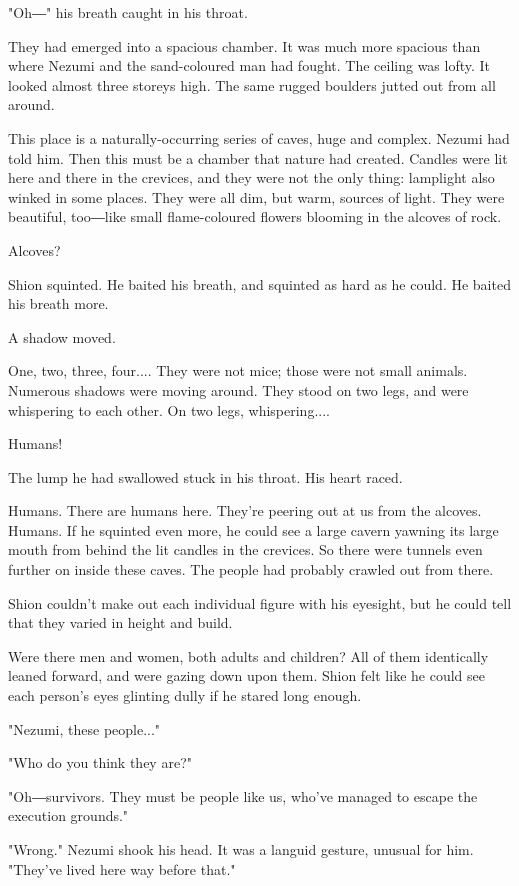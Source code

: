 "Oh―" his breath caught in his throat.

They had emerged into a spacious chamber. It was much more spacious than
where Nezumi and the sand-coloured man had fought. The ceiling was
lofty. It looked almost three storeys high. The same rugged boulders
jutted out from all around.

This place is a naturally-occurring series of caves, huge and complex.
Nezumi had told him. Then this must be a chamber that nature had
created. Candles were lit here and there in the crevices, and they were
not the only thing: lamplight also winked in some places. They were all
dim, but warm, sources of light. They were beautiful, too―like small
flame-coloured flowers blooming in the alcoves of rock.

Alcoves?

Shion squinted. He baited his breath, and squinted as hard as he could.
He baited his breath more.

A shadow moved.

One, two, three, four.... They were not mice; those were not small
animals. Numerous shadows were moving around. They stood on two legs,
and were whispering to each other. On two legs, whispering....

Humans!

The lump he had swallowed stuck in his throat. His heart raced.

Humans. There are humans here. They're peering out at us from the
alcoves. Humans. If he squinted even more, he could see a large cavern
yawning its large mouth from behind the lit candles in the crevices. So
there were tunnels even further on inside these caves. The people had
probably crawled out from there.

Shion couldn't make out each individual figure with his eyesight, but he
could tell that they varied in height and build.

Were there men and women, both adults and children? All of them
identically leaned forward, and were gazing down upon them. Shion felt
like he could see each person's eyes glinting dully if he stared long
enough.

"Nezumi, these people..."

"Who do you think they are?"

"Oh―survivors. They must be people like us, who've managed to escape the
execution grounds."

"Wrong." Nezumi shook his head. It was a languid gesture, unusual for
him. "They've lived here way before that."

